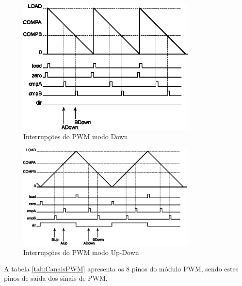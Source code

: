 \begin{figure}[H]
	\centering
	\includegraphics[width=0.8\textwidth] {figuras/PWMCountDownMode.eps}
	\caption{Interrupções do PWM modo Down \cite{DATASHEET_TIVA}}
	\label{fig:PWMCountDownMode}
\end{figure}

\begin{figure}[H]
	\centering
	\includegraphics[width=0.8\textwidth] {figuras/PWMCountUpDownMode.eps}
	\caption{Interrupções do PWM modo Up-Down \cite{DATASHEET_TIVA}}
	\label{fig:PWMCountUpDownMode}
\end{figure}

A tabela \ref{tab:CanaisPWM} apresenta os 8 pinos do módulo PWM, sendo estes pinos de saída dos sinais de PWM.  

